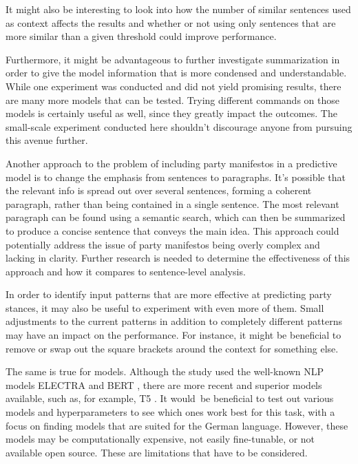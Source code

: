 It might also be interesting to look into how the number of similar sentences used as context affects the results and whether or not using only sentences that are more similar than a given threshold could improve performance.

Furthermore, it might be advantageous to further investigate summarization in order to give the model information that is more condensed and understandable. While one experiment was conducted and did not yield promising results, there are many more models that can be tested. Trying different commands on those models is certainly useful as well, since they greatly impact the outcomes. The small-scale experiment conducted here shouldn't discourage anyone from pursuing this avenue further.

Another approach to the problem of including party manifestos in a predictive model is to change the emphasis from sentences to paragraphs. It's possible that the relevant info is spread out over several sentences, forming a coherent paragraph, rather than being contained in a single sentence. The most relevant paragraph can be found using a semantic search, which can then be summarized to produce a concise sentence that conveys the main idea. This approach could potentially address the issue of party manifestos being overly complex and lacking in clarity. Further research is needed to determine the effectiveness of this approach and how it compares to sentence-level analysis.

In order to identify input patterns that are more effective at predicting party stances, it may also be useful to experiment with even more of them. Small adjustments to the current patterns in addition to completely different patterns may have an impact on the performance. For instance, it might be beneficial to remove or swap out the square brackets around the context for something else.

The same is true for models. Although the study used the well-known NLP models ELECTRA \citep{clark2020electra} and BERT \citep{devlin2018bert}, there are more recent and superior models available, such as, for example, T5 \citep{xue2020mt5}. It would be beneficial to test out various models and hyperparameters to see which ones work best for this task, with a focus on finding models that are suited for the German language. However, these models may be computationally expensive, not easily fine-tunable, or not available open source. These are limitations that have to be considered.


